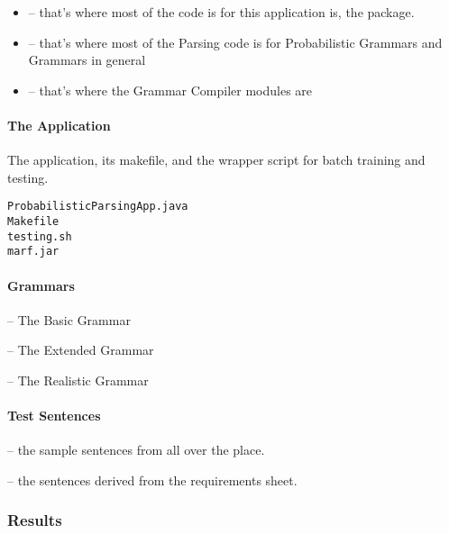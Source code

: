 \begin{itemize}

\item
{} -- that's where most of the code is for this application is, the  package.

\item
{} -- that's where most of the Parsing code is for Probabilistic Grammars and
Grammars in general

\item
{} -- that's where the Grammar Compiler modules are

\end{itemize}

\paragraph*{The Application}

The application, its makefile, and
the wrapper script for batch training and testing.

\begin{verbatim}
ProbabilisticParsingApp.java
Makefile
testing.sh
marf.jar
\end{verbatim}

\paragraph*{Grammars}

\noindent
{} -- The Basic Grammar

\noindent
{} -- The Extended Grammar

\noindent
{} -- The Realistic Grammar


\paragraph*{Test Sentences}

\noindent
{} -- the sample sentences from all over the place.

\noindent
{} -- the sentences derived from the requirements sheet.



\subsubsection{Results}
\label{sect:prob-parse-results}

